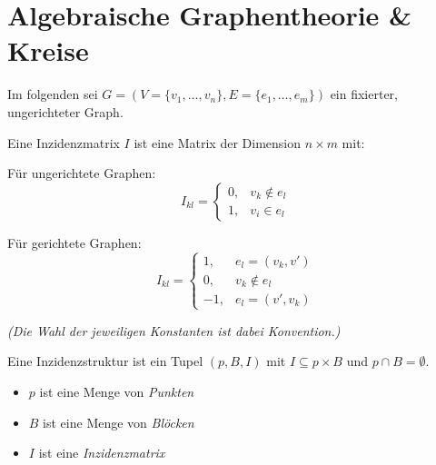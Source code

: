 \chapter{Algebraische Graphentheorie \& Kreise}

Im folgenden sei $ G = (V = \{ v_1, \dots, v_n \}, E = \{ e_1, \dots, e_m \}) $ ein fixierter, ungerichteter Graph.

\begin{definition}[Inzidenzmatrix]
    Eine Inzidenzmatrix $ I $ ist eine Matrix der Dimension $ n \times m $ mit:
    \begin{multicols}{2}
        Für ungerichtete Graphen:
        \begin{equation*}
            I_{kl} = \begin{cases}
                0, & v_k \notin e_l \\
                1, & v_i \in e_l
            \end{cases}
        \end{equation*}

        \columnbreak

        Für gerichtete Graphen:
        \begin{equation*}
            I_{kl} = \begin{cases}
                1, & e_l = (v_k, v') \\
                0, & v_k \notin e_l \\
                -1, & e_l = (v', v_k)
            \end{cases}
        \end{equation*}
    \end{multicols}

    \textit{(Die Wahl der jeweiligen Konstanten ist dabei Konvention.)}
\end{definition}

\begin{definition}[Inzidenzstruktur]
    Eine Inzidenzstruktur ist ein Tupel $ (p, B, I) $ mit $ I \subseteq p \times B $ und $ p \cap B = \emptyset $.
    \begin{itemize}
        \item $ p $ ist eine Menge von \textit{Punkten}
        \item $ B $ ist eine Menge von \textit{Blöcken}
        \item $ I $ ist eine \textit{Inzidenzmatrix}
    \end{itemize}
\end{definition}

